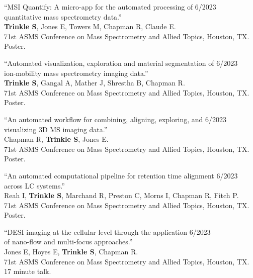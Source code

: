 \documentclass[10pt,letterpaper]{article}
\begin{document}
\begin{benumerate}{17}

\item{``MSI Quantify: A micro-app for the automated processing of \hfill 6/2023\\ quantitative mass spectrometry data.''\\
    \textbf{Trinkle S}, Jones E, Towers M, Chapman R, Claude E.\\
    71st ASMS Conference on Mass Spectrometry and Allied Topics, Houston, TX.\\
    Poster.}
  
\item{``Automated visualization, exploration and material segmentation of \hfill 6/2023\\ ion-mobility mass spectrometry imaging data.''\\
    \textbf{Trinkle S}, Gangal A, Mather J, Shrestha B, Chapman R.\\
    71st ASMS Conference on Mass Spectrometry and Allied Topics, Houston, TX.\\
    Poster.}
  
\item{``An automated workflow for combining, aligning, exploring, and \hfill 6/2023\\ visualizing 3D MS imaging data.''\\
    Chapman R, \textbf{Trinkle S}, Jones E.\\
    71st ASMS Conference on Mass Spectrometry and Allied Topics, Houston, TX.\\
    Poster.}
  
\item{``An automated computational pipeline for retention time alignment \hfill 6/2023\\ across LC systems.''\\
    Reah I, \textbf{Trinkle S}, Marchand R, Preston C, Morns I, Chapman R, Fitch P.\\
    71st ASMS Conference on Mass Spectrometry and Allied Topics, Houston, TX.\\
    Poster.}
  
\item{``DESI imaging at the cellular level through the application \hfill 6/2023\\ of nano-flow and multi-focus approaches.''\\
    Jones E, Hoyes E, \textbf{Trinkle S}, Chapman R.\\
    71st ASMS Conference on Mass Spectrometry and Allied Topics, Houston, TX.\\
    17 minute talk.}
  

\end{benumerate}
\end{document}
